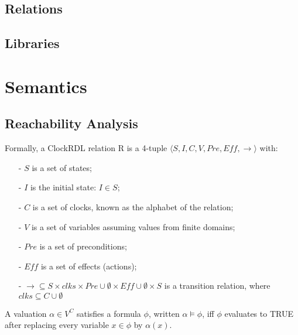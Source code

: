 \documentclass[11pt, oneside]{article}   	%
\begin{document}
\subsection{Relations}
\subsection{Libraries}
\section{Semantics}

\subsection{Reachability Analysis}
Formally, a ClockRDL relation R is a 4-tuple $\langle S, I, C, V, Pre, Eff, \rightarrow \rangle$ with:
\begin{itemize}
\itemsep0em
\item[-] $S$ is a set of states;
\item[-] $I$ is the initial state: $I \in S$;
\item[-] $C$ is a set of clocks, known as the alphabet of the relation;
\item[-] $V$ is a set of variables assuming values from finite domains;
\item[-] $Pre$ is a set of preconditions;
\item[-] $Eff$ is a set of effects (actions);
\item[-] $\rightarrow \subseteq S \times clks \times Pre \cup \emptyset \times Eff \cup \emptyset \times S$ is a transition relation, where $clks \subseteq C \cup \emptyset$
\end{itemize}


A valuation $\alpha \in V^C$  satisfies a formula $\phi$, written $\alpha \models \phi$, iff $\phi$ evaluates to TRUE
after replacing every variable $x \in \phi$ by $\alpha(x)$.
\end{document}

